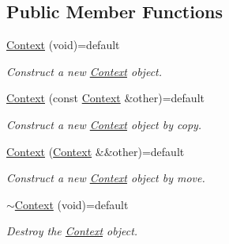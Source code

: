 \subsection*{Public Member Functions}
\begin{DoxyCompactItemize}
\item 
\mbox{\label{classo_z_1_1_context_af3aab1b32d4333320612049bdafb07d7}} 
\mbox{\hyperlink{classo_z_1_1_context_af3aab1b32d4333320612049bdafb07d7}{Context}} (void)=default
\begin{DoxyCompactList}\small\item\em Construct a new \mbox{\hyperlink{classo_z_1_1_context}{Context}} object. \end{DoxyCompactList}\item 
\mbox{\label{classo_z_1_1_context_a906eb29f22e89bc121c47096c7a4b601}} 
\mbox{\hyperlink{classo_z_1_1_context_a906eb29f22e89bc121c47096c7a4b601}{Context}} (const \mbox{\hyperlink{classo_z_1_1_context}{Context}} \&other)=default
\begin{DoxyCompactList}\small\item\em Construct a new \mbox{\hyperlink{classo_z_1_1_context}{Context}} object by copy. \end{DoxyCompactList}\item 
\mbox{\label{classo_z_1_1_context_ad4a49704266f6e8312b1c9c2ca8ad710}} 
\mbox{\hyperlink{classo_z_1_1_context_ad4a49704266f6e8312b1c9c2ca8ad710}{Context}} (\mbox{\hyperlink{classo_z_1_1_context}{Context}} \&\&other)=default
\begin{DoxyCompactList}\small\item\em Construct a new \mbox{\hyperlink{classo_z_1_1_context}{Context}} object by move. \end{DoxyCompactList}\item 
\mbox{\label{classo_z_1_1_context_afe2e01a552a7711772e4028f778703e8}} 
\mbox{\hyperlink{classo_z_1_1_context_afe2e01a552a7711772e4028f778703e8}{$\sim$\+Context}} (void)=default
\begin{DoxyCompactList}\small\item\em Destroy the \mbox{\hyperlink{classo_z_1_1_context}{Context}} object. \end{DoxyCompactList}\item 
\mbox{\label{classo_z_1_1_context_ae675e54f6453c48ee8ccf96706965429}} 

\end{DoxyCompactItemize}
